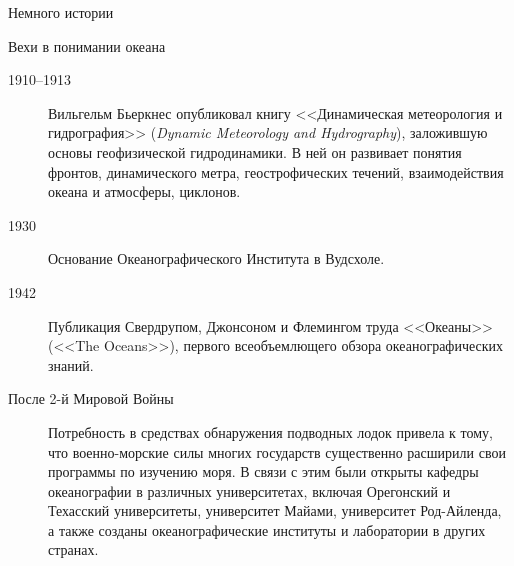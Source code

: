 \begin{chapter}{Немного истории}
\begin{section}{Вехи в понимании океана}
\begin{description}
\item[1910--1913] Вильгельм Бьеркнес опубликовал
книгу <<Динамическая метеорология и гидрография>> (\textsl{Dynamic Meteorology
and Hydrography}), заложившую основы геофизической гидродинамики. В ней
он развивает понятия фронтов, динамического метра, геострофических течений,
взаимодействия океана и атмосферы, циклонов.
%


\item[1930] Основание Океанографического Института в Вудсхоле.
%



\item[1942] Публикация Свердрупом, Джонсоном и Флемингом труда
<<Океаны>> (<<The Oceans>>), первого всеобъемлющего обзора
океанографических знаний.
%


\item[После 2-й Мировой Войны] Потребность в средствах обнаружения 
подводных лодок привела к тому, что военно-морские силы многих государств 
существенно расширили свои программы по изучению моря. В связи с этим
были открыты кафедры океанографии в различных
университетах, включая Орегонский и Техасский университеты,
университет Майами, университет Род-Айленда, а также созданы 
океанографические институты и лаборатории в других странах.
%


\end{description}
\end{section}
\end{chapter}
